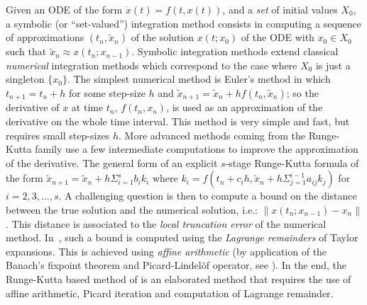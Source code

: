 Given an ODE of the form $\dot{x}(t)=f(t,x(t))$, and a {\em set} of initial values $X_0$,
a symbolic (or ``set-valued'') integration method consists in computing a sequence of
approximations $(t_n, \tilde{x}_n)$ of the solution $x(t; x_0)$ of the ODE
with $x_0\in X_0$ such that $\tilde{x}_n \approx x(t_n; x_{n-1})$.
Symbolic integration methods extend classical {\em numerical} integration methods which correspond to the case where $X_0$ is just a singleton $\{x_0\}$.
The simplest numerical method is Euler's method in which $t_{n+1} = t_n + h$
for some step-size $h$ and $\tilde{x}_{n+1} = \tilde{x}_n + h f(t_n,\tilde{x}_n)$; so
the derivative of $x$ at time $t_n$, $f(t_n, x_n)$, is used as an
approximation of the derivative on the whole time interval. This method is very simple
and fast, but requires small step-sizes $h$.
More advanced
methods coming from the Runge-Kutta family use a few
intermediate computations to improve the approximation
of the derivative. The general form of an explicit $s$-stage
Runge-Kutta formula
of the form $\tilde{x}_{n+1}=\tilde{x}_n+h\Sigma_{i=1}^sb_ik_i$
where $k_i=f(t_n+c_ih, \tilde{x}_n+h\Sigma_{j=1}^{i-1}a_{ij}k_j)$
for $i=2,3,...,s$.
A challenging question
is then to compute a bound on the distance between
the true solution and the numerical solution, i.e.:
$\|x(t_n; x_{n-1}) - x_n\|$. This distance is associated to the {\em local
truncation error} of the numerical method.
In~\cite{NL_minimator}, 
such a bound is computed using the {\em Lagrange
remainders} of Taylor expansions.
This is achieved using {\em affine arithmetic} \cite{AffineA97}
(by application of the Banach's fixpoint theorem and 
Picard-Lindel\"of operator, see \cite{Nedialkov}). 
In the end, the Runge-Kutta based method of \cite{NL_minimator} is an elaborated method
that requires the use of affine arithmetic, 
Picard iteration and 
computation of Lagrange remainder.

